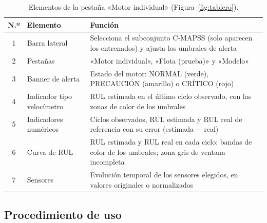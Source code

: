 \documentclass[letterpaper]{article}
\newcommand{\encabezadotabla}{\rowcolor{red!20}}
\newcommand{\filatabla}{\rowcolor{colorOtros}}
\begin{document}
\begin{table}[H]
\centering
\fontsize{9}{11}\selectfont
\caption{Elementos de la pestaña «Motor individual» (Figura~\ref{fig:tablero}).}
\label{tab:elementos}
\renewcommand{\arraystretch}{1.5}
\begin{tabularx}{\textwidth}{|c|>{\raggedright\arraybackslash}p{3.6cm}|X|}
    \hline
    \encabezadotabla \textbf{N.º} & \textbf{Elemento} & \textbf{Función} \\
    \hline
    \filatabla 1 & Barra lateral & Selecciona el subconjunto C-MAPSS (solo aparecen los entrenados) y ajusta los umbrales de alerta \\ \hline
    \filatabla 2 & Pestañas & «Motor individual», «Flota (prueba)» y «Modelo» \\ \hline
    \filatabla 3 & Banner de alerta & Estado del motor: NORMAL (verde), PRECAUCIÓN (amarillo) o CRÍTICO (rojo) \\ \hline
    \filatabla 4 & Indicador tipo velocímetro & RUL estimada en el último ciclo observado, con las zonas de color de los umbrales \\ \hline
    \filatabla 5 & Indicadores numéricos & Ciclos observados, RUL estimada y RUL real de referencia con su error (estimada $-$ real) \\ \hline
    \filatabla 6 & Curva de RUL & RUL estimada y RUL real en cada ciclo; bandas de color de los umbrales; zona gris de ventana incompleta \\ \hline
    \filatabla 7 & Sensores & Evolución temporal de los sensores elegidos, en valores originales o normalizados \\ \hline
\end{tabularx}
\end{table}

\subsection{Procedimiento de uso}
\end{document}
